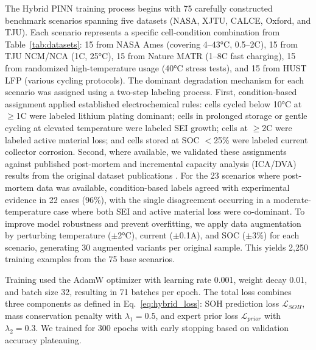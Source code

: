 \documentclass[5p,times,authoryear]{elsarticle}
\begin{document}
The Hybrid PINN training process begins with 75 carefully constructed benchmark scenarios spanning five datasets (NASA, XJTU, CALCE, Oxford, and TJU). Each scenario represents a specific cell-condition combination from Table~\ref{tab:datasets}: 15 from NASA Ames (covering 4--43°C, 0.5--2C), 15 from TJU NCM/NCA (1C, 25°C), 15 from Nature MATR (1--8C fast charging), 15 from randomized high-temperature usage (40°C stress tests), and 15 from HUST LFP (various cycling protocols). The dominant degradation mechanism for each scenario was assigned using a two-step labeling process. First, condition-based assignment applied established electrochemical rules: cells cycled below 10°C at $\geq$1C were labeled lithium plating dominant; cells in prolonged storage or gentle cycling at elevated temperature were labeled SEI growth; cells at $\geq$2C were labeled active material loss; and cells stored at SOC $<$25\% were labeled current collector corrosion. Second, where available, we validated these assignments against published post-mortem and incremental capacity analysis (ICA/DVA) results from the original dataset publications \citep{birkl2017degradation, waldmann2014temperature}. For the 23 scenarios where post-mortem data was available, condition-based labels agreed with experimental evidence in 22 cases (96\%), with the single disagreement occurring in a moderate-temperature case where both SEI and active material loss were co-dominant. To improve model robustness and prevent overfitting, we apply data augmentation by perturbing temperature ($\pm$2°C), current ($\pm$0.1A), and SOC ($\pm$3\%) for each scenario, generating 30 augmented variants per original sample. This yields 2,250 training examples from the 75 base scenarios.

Training used the AdamW optimizer \citep{loshchilov2019decoupled} with learning rate 0.001, weight decay 0.01, and batch size 32, resulting in 71 batches per epoch. The total loss combines three components as defined in Eq.~\ref{eq:hybrid_loss}: SOH prediction loss $\mathcal{L}_{SOH}$, mass conservation penalty with $\lambda_1 = 0.5$, and expert prior loss $\mathcal{L}_{prior}$ with $\lambda_2 = 0.3$. We trained for 300 epochs with early stopping based on validation accuracy plateauing.
\end{document}

